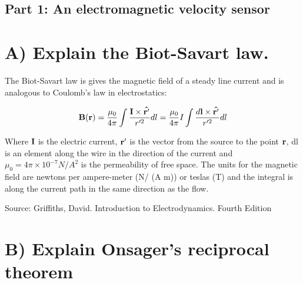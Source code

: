 \documentclass[overlapped,line,letterpaper]{res}
\begin{document}

\setlength{\leftmargini}{0em}
\renewcommand{\labelitemi}{}

\renewcommand{\namefont}{\large\textbf}


\newcommand{\bME}{{\bf T. D. Mikesell}}




\begin{resume}
\vspace{-.4cm}\hspace{-1.3cm}{\bf GEOPH677}
\hspace{11.2cm}{\bf Jan 30 2017}

\subsection{\hspace{-1.3cm}Part 1: An electromagnetic velocity sensor}

\section{A) Explain the Biot-Savart law.}

The Biot-Savart law is gives the magnetic field of a steady line current and is analogous to Coulomb's law in electrostatics:

$${\bf B}({\bf r}) = \frac{\mu_0}{4\pi} \int \frac{{\bf I \times \hat{r'} }}{r'^2}dl = \frac{\mu_0}{4\pi}I \int \frac{d{\bf l \times \hat{r'} }}{r'^2}dl$$

Where ${\bf I}$ is the electric current, ${\bf r'}$ is the vector from the source to the point ${\bf r}$, dl is an element along the wire in the direction of the current and $\mu_0 = 4\pi \times 10^{-7} N/A^2$ is the permeability of free space. The units for the magnetic field are newtons per ampere-meter (N/ (A m)) or teslas (T) and the integral is along the current path in the same direction as the flow.
 

Source: Griffiths, David. Introduction to Electrodynamics. Fourth Edition

\section{B) Explain Onsager's reciprocal theorem}


\end{resume}
\end{document}

